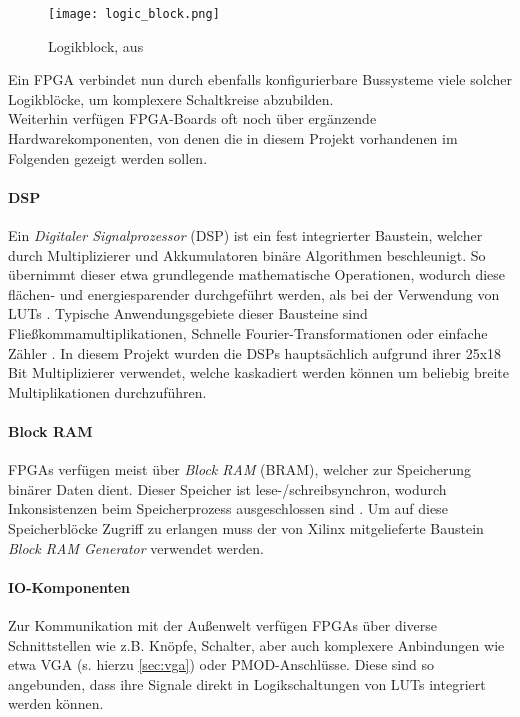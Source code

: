 \documentclass[a4paper,12pt,onesided]{report}
\begin{document}
\begin{figure}[H]
	\centering
	\texttt{[image: logic\_block.png]}
	\caption{Logikblock, aus \cite{fpgaDesign}}
	\label{fig:logikblock}
\end{figure}

Ein FPGA verbindet nun durch ebenfalls konfigurierbare Bussysteme viele solcher Logikblöcke, um komplexere Schaltkreise abzubilden.\\
Weiterhin verfügen FPGA-Boards oft noch über ergänzende Hardwarekomponenten, von denen die in diesem Projekt vorhandenen im Folgenden gezeigt werden sollen.

\paragraph{DSP}
Ein \textit{Digitaler Signalprozessor} (DSP) ist ein fest integrierter Baustein, welcher durch Multiplizierer und Akkumulatoren binäre Algorithmen beschleunigt.
So übernimmt dieser etwa grundlegende mathematische Operationen, wodurch diese flächen- und energiesparender durchgeführt werden, als bei der Verwendung von LUTs \cite[S. 52]{dsps}.
Typische Anwendungsgebiete dieser Bausteine sind Fließkommamultiplikationen, Schnelle Fourier-Transformationen oder einfache Zähler \cite[S. 14]{dsps}. 
In diesem Projekt wurden die DSPs hauptsächlich aufgrund ihrer 25x18 Bit Multiplizierer verwendet, welche kaskadiert werden können um beliebig breite Multiplikationen durchzuführen.

\paragraph{Block RAM}
FPGAs verfügen meist über \textit{Block RAM} (BRAM), welcher zur Speicherung binärer Daten dient. Dieser Speicher ist lese-/schreibsynchron, wodurch Inkonsistenzen beim Speicherprozess ausgeschlossen sind \cite[S. 11]{bram}. Um auf diese Speicherblöcke Zugriff zu erlangen muss der von Xilinx mitgelieferte Baustein \textit{Block RAM Generator} verwendet werden.

\paragraph{IO-Komponenten}
Zur Kommunikation mit der Außenwelt verfügen FPGAs über diverse Schnittstellen wie z.B. Knöpfe, Schalter, aber auch komplexere Anbindungen wie etwa VGA (s. hierzu \autoref{sec:vga}) oder PMOD-Anschlüsse.
Diese sind so angebunden, dass ihre Signale direkt in Logikschaltungen von LUTs integriert werden können.
\end{document}
